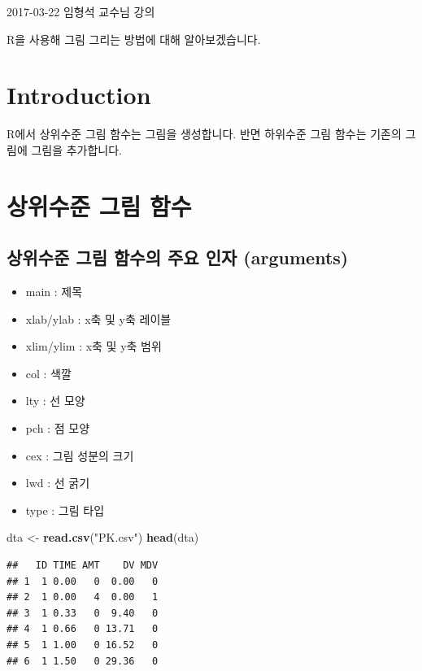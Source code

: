 \documentclass[10pt,]{krantz}
\makeatletter
\newenvironment{Shaded}{\begin{snugshade}}{\end{snugshade}}
\newcommand{\KeywordTok}[1]{\textcolor[rgb]{0.13,0.29,0.53}{\textbf{#1}}}
\newcommand{\StringTok}[1]{\textcolor[rgb]{0.31,0.60,0.02}{#1}}
\newcommand{\NormalTok}[1]{#1}
\providecommand{\tightlist}{%
  \setlength{\itemsep}{0pt}\setlength{\parskip}{0pt}}
\renewenvironment{quote}{\begin{VF}}{\end{VF}}
\newenvironment{kframe}{%
\medskip{}
\setlength{\fboxsep}{.8em}
 \def\at@end@of@kframe{}%
 \ifinner\ifhmode%
  \def\at@end@of@kframe{\end{minipage}}%
  \begin{minipage}{\columnwidth}%
 \fi\fi%
 \def\FrameCommand##1{\hskip\@totalleftmargin \hskip-\fboxsep
 \colorbox{shadecolor}{##1}\hskip-\fboxsep
     \hskip-\linewidth \hskip-\@totalleftmargin \hskip\columnwidth}%
 \MakeFramed {\advance\hsize-\width
   \@totalleftmargin\z@ \linewidth\hsize
   \@setminipage}}%
 {\par\unskip\endMakeFramed%
 \at@end@of@kframe}
\renewenvironment{Shaded}{\begin{kframe}}{\end{kframe}}
\makeatother
\begin{document}
\begin{quote}
2017-03-22 임형석 교수님 강의
\end{quote}

R을 사용해 그림 그리는 방법에 대해 알아보겠습니다.

\section{Introduction}\label{introduction}

R에서 상위수준 그림 함수는 그림을 생성합니다. 반면 하위수준 그림 함수는
기존의 그림에 그림을 추가합니다.

\section{상위수준 그림 함수}\label{upper}

\subsection{상위수준 그림 함수의 주요 인자
(arguments)}\label{-----arguments}

\begin{itemize}
\tightlist
\item
  main : 제목
\item
  xlab/ylab : x축 및 y축 레이블
\item
  xlim/ylim : x축 및 y축 범위
\item
  col : 색깔
\item
  lty : 선 모양
\item
  pch : 점 모양
\item
  cex : 그림 성분의 크기
\item
  lwd : 선 굵기
\item
  type : 그림 타입
\end{itemize}

\begin{Shaded}
\begin{Highlighting}[]
\NormalTok{dta <-}\StringTok{ }\KeywordTok{read.csv}\NormalTok{(}\StringTok{"PK.csv"}\NormalTok{)}
\KeywordTok{head}\NormalTok{(dta)}
\end{Highlighting}
\end{Shaded}

\begin{verbatim}
##   ID TIME AMT    DV MDV
## 1  1 0.00   0  0.00   0
## 2  1 0.00   4  0.00   1
## 3  1 0.33   0  9.40   0
## 4  1 0.66   0 13.71   0
## 5  1 1.00   0 16.52   0
## 6  1 1.50   0 29.36   0
\end{verbatim}
\end{document}
